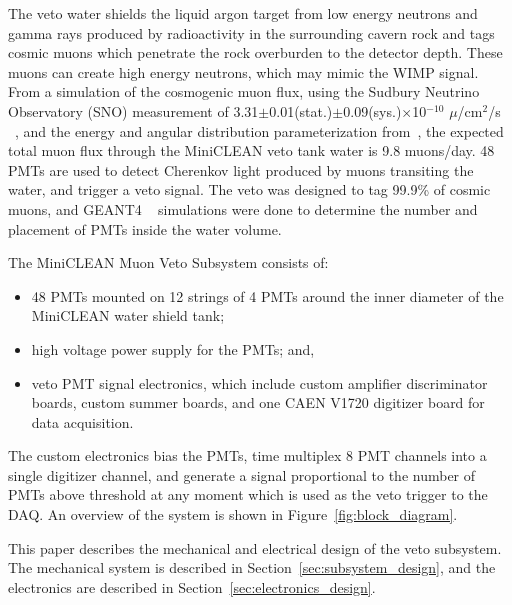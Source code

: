\documentclass[review,number,sort&compress]{elsarticle}
\begin{document}
The veto water shields the liquid argon target from low energy neutrons and gamma
rays produced by radioactivity in the surrounding cavern rock and tags cosmic muons
which penetrate the rock overburden to the detector depth. These muons can
create high energy neutrons, which may mimic the WIMP signal.
From a simulation of the cosmogenic muon flux, using the Sudbury Neutrino Observatory (SNO) measurement of
3.31$\pm$0.01(stat.)$\pm$0.09(sys.)$\times$10$^{-10}$ $\mu$/cm$^2$/s
~\cite{ref:sno_muon_flux}, and the energy and angular distribution
parameterization from~\cite{ref:mei_and_hime}, the expected total muon flux
through the MiniCLEAN veto tank water is 9.8 muons/day. 48 PMTs are used to
detect Cherenkov light produced by muons transiting the water, and trigger a
veto signal. The veto was designed to tag 99.9\% of cosmic muons, and GEANT4
~\cite{ref:geant4} simulations were done to determine the number and placement
of PMTs inside the water volume. 

The MiniCLEAN Muon Veto Subsystem consists of:
\begin{itemize}
\item 48 PMTs mounted on 12 strings of 4 PMTs around the inner diameter of the MiniCLEAN water shield tank;
\item high voltage power supply for the PMTs; and,
\item veto PMT signal electronics, which include custom amplifier discriminator boards, custom summer boards, and one CAEN V1720 digitizer board for data acquisition. 
\end{itemize}
The custom electronics bias the PMTs, time multiplex 8 PMT channels into a
single digitizer channel, and generate a signal proportional to the number
of PMTs above threshold at any moment which is used as the veto trigger to
the DAQ. An overview of the system is shown in
Figure~\ref{fig:block_diagram}.

This paper describes the mechanical and electrical design of the veto
subsystem. The mechanical system is described in
Section~\ref{sec:subsystem_design}, and the electronics are
described in Section~\ref{sec:electronics_design}.
\end{document}
